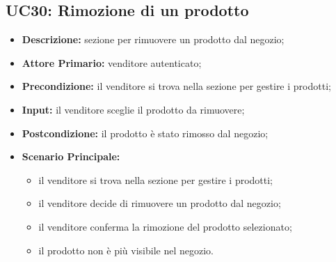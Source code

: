 \subsection{UC30: Rimozione di un prodotto}
\label{sec:UC30}
\begin{itemize}
    \item \textbf{Descrizione:} sezione per rimuovere un prodotto dal negozio;
    \item \textbf{Attore Primario:} venditore autenticato;
    \item \textbf{Precondizione:} il venditore si trova nella sezione per gestire i prodotti;
    \item \textbf{Input:} il venditore sceglie il prodotto da rimuovere;
    \item \textbf{Postcondizione:} il prodotto è stato rimosso dal negozio;
    \item \textbf{Scenario Principale:}
          \begin{itemize}
              \item il venditore si trova nella sezione per gestire i prodotti;
              \item il venditore decide di rimuovere un prodotto dal negozio;
              \item il venditore conferma la rimozione del prodotto selezionato;
              \item il prodotto non è più visibile nel negozio.
          \end{itemize}
\end{itemize}